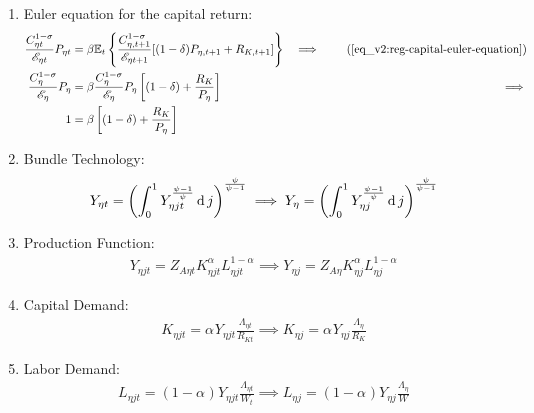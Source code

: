 \documentclass[../thesis.tex]{subfiles}
\begin{document}
\begin{enumerate}
	\item Euler equation for the capital return:
	\begin{alignat}{2}
		\frac{ C_{\eta t}^{1-\sigma}}{ \te} P_{\eta t} &= \beta \mathbb{E}_t \left\{ \frac{ C_{\eta, t+1}^{1-\sigma}}{ \te[t+1]} [(1-\delta) P_{\eta, t+1} + R_{K,t+1}] \right\} &\implies \tag{\ref{eq_v2:reg-capital-euler-equation}} \\
		\frac{ C_{\eta}^{1-\sigma}}{ \te[]} P_{\eta} &= \beta \frac{ C_{\eta}^{1-\sigma}}{ \te[]} P_{\eta} \left[ (1-\delta) + \frac{R_{K}}{P_{\eta}} \right] &\implies \nonumber \\
		1 &= \beta \left[ (1-\delta) + \frac{R_{K}}{P_{\eta}} \right] \label{eq_v2:reg-ss-capital-euler-equation}
	\end{alignat}

	\item Bundle Technology:
	\begin{align}
		Y_{\eta t} = \left( \int_{0}^{1} Y_{\eta jt}^{\frac{\psi-1}{\psi}} \dif j \right)^{\frac{\psi}{\psi-1}} \implies %
		Y_{\eta} = \left( \int_{0}^{1} Y_{\eta j}^{\frac{\psi-1}{\psi}} \dif j \right)^{\frac{\psi}{\psi-1}} \label{eq_v2:reg-ss-final-goods-firm-bundle-rule}
	\end{align}
	
	\item Production Function:
	\begin{align}
		Y_{\eta jt} = Z_{A\eta t} K_{\eta jt}^{\alpha_{}} L_{\eta jt}^{1-{\alpha_{}}} \implies Y_{\eta j} = Z_{A\eta} K_{\eta j}^{\alpha_{}} L_{\eta j}^{1-{\alpha_{}}} \label{eq_v2:reg-ss-int-good-firm-production-function}
	\end{align}
	
	\item Capital Demand:
	\begin{align}
		K_{\eta jt} = {\alpha_{}} Y_{\eta jt} \frac{\Lambda_{\eta t}}{R_{Kt}} \implies K_{\eta j} = {\alpha_{}} Y_{\eta j} \frac{\Lambda_{\eta}}{R_K} \label{eq_v2:reg-ss-int-good-firm-FOC-Kt}
	\end{align}
	
	\item Labor Demand:
	\begin{align}
		L_{\eta jt} = (1-{\alpha_{}}) Y_{\eta jt} \frac{\Lambda_{\eta t}}{W_t} \implies L_{\eta j} = (1 -{\alpha_{}}) Y_{\eta j} \frac{\Lambda_{\eta}}{W} \label{eq_v2:reg-ss-int-good-firm-FOC-Lt}
	\end{align}
	

\end{enumerate}
\end{document}
